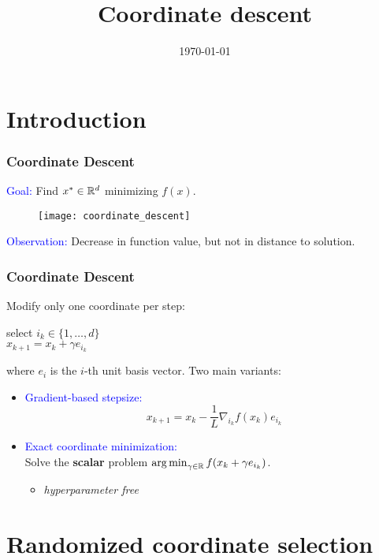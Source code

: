 \documentclass[aspectratio=149]{beamer}
\title{Coordinate descent}
\date{\today}
\begin{document}
\maketitle
\frame{\tableofcontents}


\section{Introduction}%


\begin{frame}
  \frametitle{Coordinate Descent}
  \textcolor{blue}{Goal:} Find $x^* \in \mathbb{R}^d$ minimizing $f(x)$.

  \begin{figure}[ht]
    \centering
    \texttt{[image: coordinate\_descent]}
  \end{figure}
  \textcolor{blue}{Observation:} Decrease in function value, but not in distance to solution.
\end{frame}

\begin{frame}
  \frametitle{Coordinate Descent}
  Modify only one coordinate per step:
  \begin{block}{}
    \begin{center}
      select $i_k \in \{1, \dots, d\}$\\
      $x_{k+1} = x_k + \gamma e_{i_k}$
    \end{center}
  \end{block}
  where $e_i$ is the $i$-th unit basis vector.
  Two main variants:
  \begin{itemize}
    \item \textcolor{blue}{Gradient-based stepsize:}
          \begin{equation}
            x_{k+1} = x_k - \frac1L \nabla_{i_k}f(x_k) e_{i_k}
          \end{equation}
    \item \textcolor{blue}{Exact coordinate minimization:} \\
          Solve the \textbf{scalar} problem $\operatorname*{arg\,min}_{\gamma\in \mathbb{R}} f(x_k + \gamma e_{i_k})$.
          \begin{itemize}
            \item \textit{hyperparameter free}
          \end{itemize}
  \end{itemize}
\end{frame}

\section{Randomized coordinate selection}%
\end{document}
